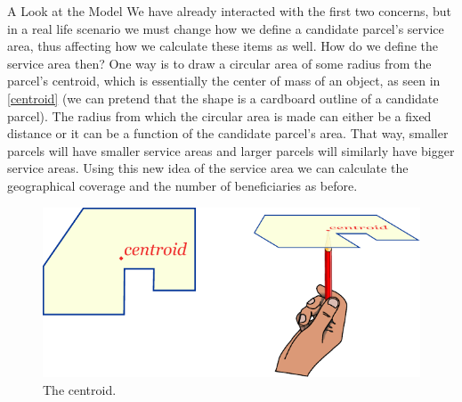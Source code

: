 \documentclass[12pt]{pom_thesis}
\theoremstyle{definition}
\begin{document}
\begin{chapter}{A Look at the Model}
We have already interacted with the first two concerns, but in a real life scenario we must change how we define a candidate parcel's service area, thus affecting how we calculate these items as well. How do we define the service area then? One way is to draw a circular area of some radius from the parcel's centroid, which is essentially the center of mass of an object, as seen in \autoref{centroid} (we can pretend that the shape is a cardboard outline of a candidate parcel). The radius from which the circular area is made can either be a fixed distance or it can be a function of the candidate parcel's area. That way, smaller parcels will have smaller service areas and larger parcels will similarly have bigger service areas. Using this new idea of the service area we can calculate the geographical coverage and the number of beneficiaries as before. 

\begin{figure}
\centering
\includegraphics{centroid}
\caption[The centroid.]{The centroid. \footnotemark}
\label{centroid}
\end{figure}


\end{chapter}
\end{document}
